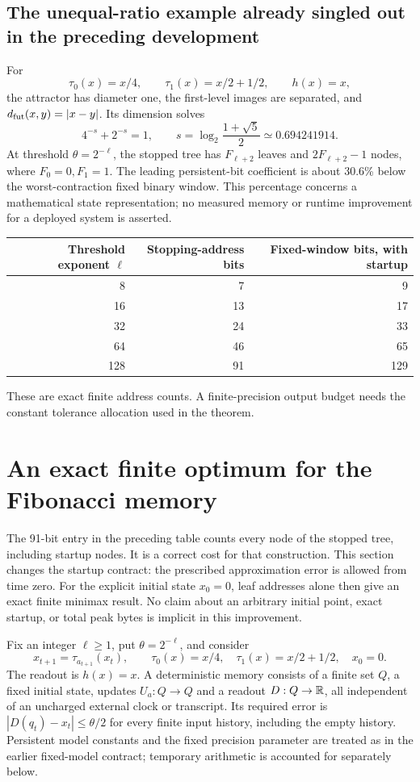 \subsection{The unequal-ratio example already singled out in the preceding development}
For
\[
 \tau_0(x)=x/4,\qquad\tau_1(x)=x/2+1/2,\qquad h(x)=x,
\]
the attractor has diameter one, the first-level images are separated, and
$d_{\rm fut}(x,y)=|x-y|$. Its dimension solves
\[
 4^{-s}+2^{-s}=1,\qquad s=\log_2\frac{1+\sqrt5}{2}
 \simeq0.694241914.
\]
At threshold $\theta=2^{-\ell}$, the stopped tree has $F_{\ell+2}$ leaves
and $2F_{\ell+2}-1$ nodes, where $F_0=0,F_1=1$. The leading persistent-bit
coefficient is about 30.6\% below the worst-contraction fixed binary window.
This percentage concerns a mathematical state representation; no measured
memory or runtime improvement for a deployed system is asserted.

\begin{center}
\begin{tabular}{@{}rrr@{}}\toprule
Threshold exponent $\ell$ & Stopping-address bits & Fixed-window bits, with startup\\\midrule
8 & 7 & 9\\16 & 13 & 17\\32 & 24 & 33\\64 & 46 & 65\\128 & 91 & 129\\\bottomrule
\end{tabular}
\end{center}
These are exact finite address counts. A finite-precision output budget needs
the constant tolerance allocation used in the theorem.

\section{An exact finite optimum for the Fibonacci memory}
\label{III:M:sec:leaf-optimum}
The 91-bit entry in the preceding table counts every node of the stopped
tree, including startup nodes. It is a correct cost for that construction.
This section changes the startup contract: the prescribed approximation
error is allowed from time zero. For the explicit initial state $x_0=0$,
leaf addresses alone then give an exact finite minimax result. No claim
about an arbitrary initial point, exact startup, or total peak bytes is
implicit in this improvement.

Fix an integer $\ell\ge1$, put $\theta=2^{-\ell}$, and consider
\[
 x_{t+1}=\tau_{a_{t+1}}(x_t),\qquad
 \tau_0(x)=x/4,\quad \tau_1(x)=x/2+1/2,\quad x_0=0.
\]
The readout is $h(x)=x$. A deterministic memory consists of a finite set
$Q$, a fixed initial state, updates $U_a:Q\to Q$ and a readout
$D:Q\to\mathbb R$, all independent of an uncharged external clock or transcript.
Its required error is $|D(q_t)-x_t|\le\theta/2$ for every finite input
history, including the empty history. Persistent model constants and the
fixed precision parameter are treated as in the earlier fixed-model
contract; temporary arithmetic is accounted for separately below.

